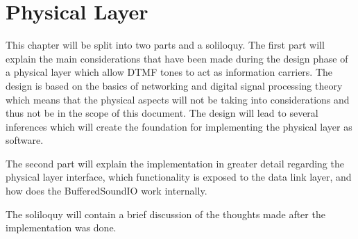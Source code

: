 \chapter{Physical Layer}\label{chap:physical}
This chapter will be split into two parts and a soliloquy. The first part will
explain the main considerations that have been made during the design phase of
a physical layer which allow DTMF tones to act as information carriers.
The design is based on the basics of networking and digital signal processing
theory which means that the physical aspects will not be taking into considerations
and thus not be in the scope of this document. The design will lead to several
inferences which will create the foundation for implementing the physical layer as software.

The second part will explain the implementation in greater detail regarding the physical layer
interface, which functionality is exposed to the data link layer, and how does the BufferedSoundIO
work internally.

The soliloquy will contain a brief discussion of the thoughts made after the implementation
was done.

